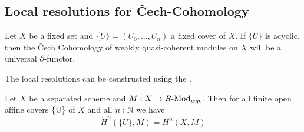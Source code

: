 \subsection{Local resolutions for \v{C}ech-Cohomology}

Let $X$ be a fixed set and $\{U\}=(U_0,\dots,U_n)$ a fixed cover of $X$.
If $\{U\}$ is acyclic, then the \v{C}ech Cohomology of weakly quasi-coherent modules on $X$
will be a universal $\partial$-functor.

The local resolutions can be constructed using the .

\begin{theorem}
\label{cech-EM-cohomology}
  Let $X$ be a separated scheme and $M:X\to R\text{-}\mathrm{Mod}_{wqc}$.
  Then for all finite open affine covers \{U\} of $X$ and all $n:\mathbb{N}$ we have
  \[
    \check{H}^n(\{U\},M)=H^n(X,M)
  \]
\end{theorem}
